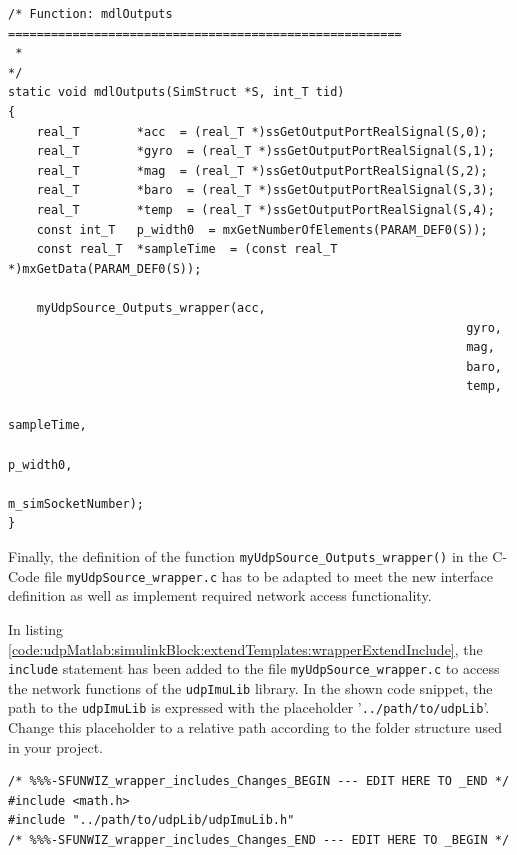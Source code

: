 \begin{lstlisting}[caption={[\texttt{myUdpSource.c} with changed call of \texttt{myUdpSource\_Outputs\_wrapper()}]C-Code template file 'myUdpSource.c' with changed call of the external function \texttt{myUdpSource\_Outputs\_wrapper()} inside the function body of function \texttt{mdlOutputs} (code snippet of listing \ref{code:c-sFunc-Code:rawTemplate}, lines 289 ll.)},label=code:udpMatlab:simulinkBlock:extendTemplates:changedWrapperCall,firstnumber=289]
/* Function: mdlOutputs =======================================================
 *
*/
static void mdlOutputs(SimStruct *S, int_T tid)
{
    real_T        *acc  = (real_T *)ssGetOutputPortRealSignal(S,0);
    real_T        *gyro  = (real_T *)ssGetOutputPortRealSignal(S,1);
    real_T        *mag  = (real_T *)ssGetOutputPortRealSignal(S,2);
    real_T        *baro  = (real_T *)ssGetOutputPortRealSignal(S,3);
    real_T        *temp  = (real_T *)ssGetOutputPortRealSignal(S,4);
    const int_T   p_width0  = mxGetNumberOfElements(PARAM_DEF0(S));
    const real_T  *sampleTime  = (const real_T *)mxGetData(PARAM_DEF0(S));

    myUdpSource_Outputs_wrapper(acc,
																gyro, 
																mag, 
																baro, 
																temp, 
																sampleTime, 
																p_width0, 
																m_simSocketNumber);
}
\end{lstlisting}

Finally, the definition of the function \texttt{myUdpSource\_Outputs\_wrapper()} in the C-Code file \texttt{myUdpSource\_wrapper.c} has to be adapted to meet the new interface definition as well as implement required network access functionality.

In listing \ref{code:udpMatlab:simulinkBlock:extendTemplates:wrapperExtendInclude}, the \texttt{include} statement has been added to the file \texttt{myUdpSource\_wrapper.c} to access the network functions of the \texttt{udpImuLib} library. In the shown code snippet, the path to the \texttt{udpImuLib} is expressed with the placeholder '\texttt{../path/to/udpLib}'. Change this placeholder to a relative path according to the folder structure used in your project.

\begin{lstlisting}[caption={[\texttt{myUdpSource\_wrapper.c} with added include]C-Code template file 'myUdpSource\_wrapper.c' with added include statement for \texttt{udpImuLib} library (code snippet of listing \ref{code:c-sFunc-Code:rawTemplateWrapper}, lines 36 ll.)},label=code:udpMatlab:simulinkBlock:extendTemplates:wrapperExtendInclude,firstnumber=36]
/* %%%-SFUNWIZ_wrapper_includes_Changes_BEGIN --- EDIT HERE TO _END */
#include <math.h>
#include "../path/to/udpLib/udpImuLib.h"
/* %%%-SFUNWIZ_wrapper_includes_Changes_END --- EDIT HERE TO _BEGIN */
\end{lstlisting}

